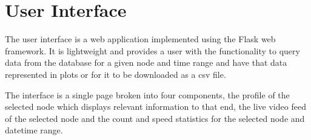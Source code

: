 \section{User Interface}

The user interface is a web application implemented using the Flask web framework. It is lightweight and provides a user with the functionality to query data from the database for a given node and time range and have that data represented in plots or for it to be downloaded as a csv file. 

The interface is a single page broken into four components, the profile of the selected node which displays relevant information to that end, the live video feed of the selected node and the count and speed statistics for the selected node and datetime range.





